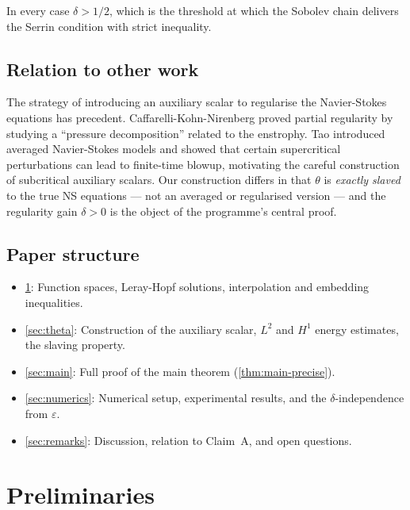 \documentclass[12pt]{article}
\theoremstyle{plain}
\theoremstyle{definition}
\theoremstyle{remark}
\newcommand{\eps}{\varepsilon}
\begin{document}
In every case $\delta>1/2$, which is the threshold at which the Sobolev chain
delivers the Serrin condition with strict inequality.

\subsection{Relation to other work}

The strategy of introducing an auxiliary scalar to regularise the Navier-Stokes
equations has precedent.
Caffarelli-Kohn-Nirenberg \cite{CKN1982} proved partial regularity by studying
a ``pressure decomposition'' related to the enstrophy.
Tao \cite{Tao2016} introduced averaged Navier-Stokes models and showed that certain
supercritical perturbations can lead to finite-time blowup, motivating the careful
construction of subcritical auxiliary scalars.
Our construction differs in that $\theta$ is \emph{exactly slaved} to the true NS
equations — not an averaged or regularised version — and the regularity gain $\delta>0$
is the object of the programme's central proof.

\subsection{Paper structure}

\begin{itemize}[leftmargin=2em]
  \item \cref{sec:prelim}: Function spaces, Leray-Hopf solutions, interpolation
        and embedding inequalities.
  \item \cref{sec:theta}: Construction of the auxiliary scalar, $L^2$ and $H^1$
        energy estimates, the slaving property.
  \item \cref{sec:main}: Full proof of the main theorem (\cref{thm:main-precise}).
  \item \cref{sec:numerics}: Numerical setup, experimental results, and the
        $\delta$-independence from $\eps$.
  \item \cref{sec:remarks}: Discussion, relation to Claim~A, and open questions.
\end{itemize}

\section{Preliminaries}\label{sec:prelim}
\end{document}
